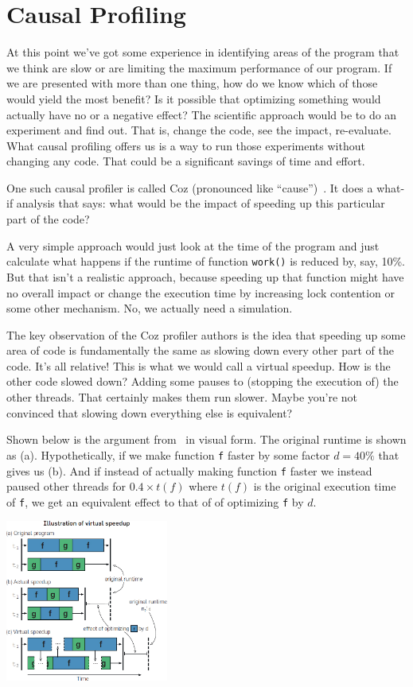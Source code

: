 \documentclass[a4paper]{report}
\begin{document}

\section*{Causal Profiling}
At this point we've got some experience in identifying areas of the program that we think are slow or are limiting the maximum performance of our program. If we are presented with more than one thing, how do we know which of those would yield the most benefit? Is it possible that optimizing something would actually have no or a negative effect? The scientific approach would be to do an experiment and find out. That is, change the code, see the impact, re-evaluate. What causal profiling offers us is a way to run those experiments without changing any code. That could be a significant savings of time and effort. 

One such causal profiler is called Coz (pronounced like ``cause'')~\cite{coz}. It does a what-if analysis that says: what would be the impact of speeding up this particular part of the code? 

A very simple approach would just look at the time of the program and just calculate what happens if the runtime of function \texttt{work()} is reduced by, say, 10\%. But that isn't a realistic approach, because speeding up that function might have no overall impact or change the execution time by increasing lock contention or some other mechanism. No, we actually need a simulation. 

The key observation of the Coz profiler authors is the idea that speeding up some area of code is fundamentally the same as slowing down every other part of the code. It's all relative! This is what we would call a virtual speedup. How is the other code slowed down? Adding some pauses to (stopping the execution of) the other threads. That certainly makes them run slower. Maybe you're not convinced that slowing down everything else is equivalent?


Shown below is the argument from~\cite{coz} in visual form. The original runtime is shown as (a). Hypothetically, if we make function \texttt{f} faster by some factor $d = 40\%$ that gives us (b). And if instead of actually making function \texttt{f} faster we instead paused other threads for $0.4 \times t(f)$ where $t(f)$ is the original execution time of \texttt{f}, we get an equivalent effect to that of of optimizing \texttt{f} by $d$.
\begin{center}
	\includegraphics[width=0.4\textwidth]{images/virtual-speedup.jpg}
\end{center}
\end{document}
